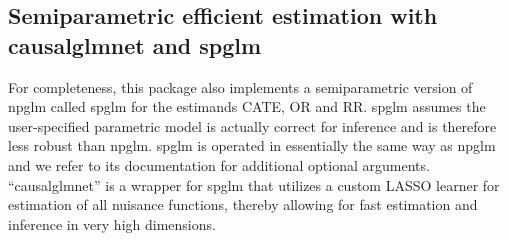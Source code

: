\documentclass[
]{jss}
\begin{document}
\hypertarget{semiparametric-efficient-estimation-with-causalglmnet-and-spglm}{%
\subsection{Semiparametric efficient estimation with causalglmnet and
spglm}\label{semiparametric-efficient-estimation-with-causalglmnet-and-spglm}}

For completeness, this package also implements a semiparametric version
of npglm called spglm for the estimands CATE, OR and RR. spglm assumes
the user-specified parametric model is actually correct for inference
and is therefore less robust than npglm. spglm is operated in
essentially the same way as npglm and we refer to its documentation for
additional optional arguments. ``causalglmnet'' is a wrapper for spglm
that utilizes a custom LASSO learner for estimation of all nuisance
functions, thereby allowing for fast estimation and inference in very
high dimensions.
\end{document}
